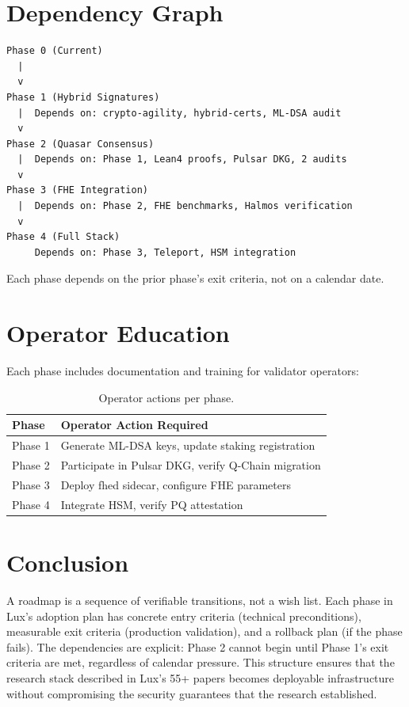 \documentclass[11pt]{article}
\begin{document}
\section{Dependency Graph}

\begin{verbatim}
Phase 0 (Current)
  |
  v
Phase 1 (Hybrid Signatures)
  |  Depends on: crypto-agility, hybrid-certs, ML-DSA audit
  v
Phase 2 (Quasar Consensus)
  |  Depends on: Phase 1, Lean4 proofs, Pulsar DKG, 2 audits
  v
Phase 3 (FHE Integration)
  |  Depends on: Phase 2, FHE benchmarks, Halmos verification
  v
Phase 4 (Full Stack)
     Depends on: Phase 3, Teleport, HSM integration
\end{verbatim}

Each phase depends on the prior phase's exit criteria, not on a calendar date.

\section{Operator Education}

Each phase includes documentation and training for validator operators:

\begin{table}[h]
\centering
\small
\begin{tabular}{@{}ll@{}}
\toprule
\textbf{Phase} & \textbf{Operator Action Required} \\
\midrule
Phase 1 & Generate ML-DSA keys, update staking registration \\
Phase 2 & Participate in Pulsar DKG, verify Q-Chain migration \\
Phase 3 & Deploy fhed sidecar, configure FHE parameters \\
Phase 4 & Integrate HSM, verify PQ attestation \\
\bottomrule
\end{tabular}
\caption{Operator actions per phase.}
\label{tab:operator}
\end{table}

\section{Conclusion}

A roadmap is a sequence of verifiable transitions, not a wish list. Each phase in Lux's adoption plan has concrete entry criteria (technical preconditions), measurable exit criteria (production validation), and a rollback plan (if the phase fails). The dependencies are explicit: Phase 2 cannot begin until Phase 1's exit criteria are met, regardless of calendar pressure. This structure ensures that the research stack described in Lux's 55+ papers becomes deployable infrastructure without compromising the security guarantees that the research established.
\end{document}
